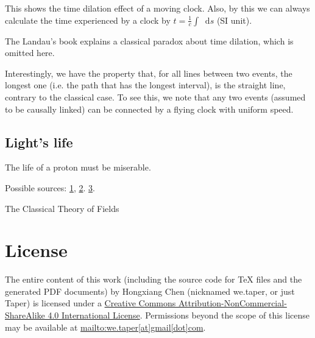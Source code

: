 \documentclass{article}
\newcommand*\diff{\mathop{}\!\mathrm{d}}
\numberwithin{equation}{subsection} %
\theoremstyle{definition}
\begin{document}
    This shows the time dilation effect of a moving clock.
    Also, by this we can always calculate the time experienced by a clock
    by $t=\frac{1}{c}\int\diff s$ (SI unit).

    The Landau's book \cite{landau} explains a classical paradox about
    time dilation, which is omitted here.

    Interestingly, we have the property that, for all lines between two
    events, the longest one (i.e. the path that has the longest interval),
    is the straight line, contrary to the classical case. To see this,
    we note that any two events (assumed to be causally linked) can be
    connected by a flying clock with uniform speed.

    \subsection{Light's life}
    \label{sec:Lights_life}
    The life of a proton must be miserable.
    
    Possible sources: \href{http://physics.stackexchange.com/questions/16018/does-a-photon-in-vacuum-have-a-rest-frame}{1},
    \href{http://physics.stackexchange.com/questions/29082/would-time-freeze-if-you-could-travel-at-the-speed-of-light}{2}.
    \href{https://www.quora.com/What-does-the-frame-of-reference-of-a-photon-look-like}{3}.
\begin{thebibliography}{1}
     The Classical Theory of Fields
\end{thebibliography}
\printnomenclature
\section{License}
The entire content of this work (including the source code
for TeX files and the generated PDF documents) by 
Hongxiang Chen (nicknamed we.taper, or just Taper) is
licensed under a 
\href{http://creativecommons.org/licenses/by-nc-sa/4.0/}{Creative 
Commons Attribution-NonCommercial-ShareAlike 4.0 International 
License}. Permissions beyond the scope of this 
license may be available at \url{mailto:we.taper[at]gmail[dot]com}.
\end{document}
